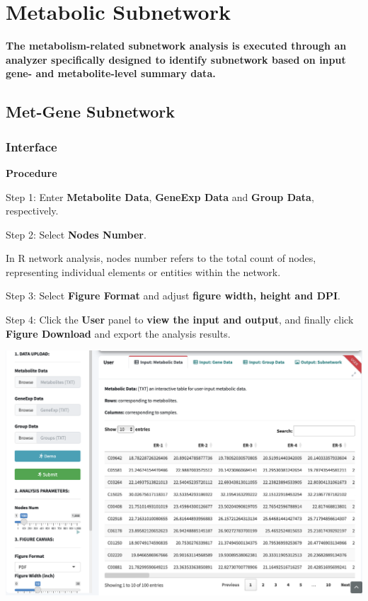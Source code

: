 \documentclass[
]{book}
\begin{document}
\chapter{Metabolic Subnetwork}\label{metabolic-subnetwork}

\textbf{The metabolism-related subnetwork analysis is executed through an analyzer specifically designed to identify subnetwork based on input gene- and metabolite-level summary data.}

\section{Met-Gene Subnetwork}\label{met-gene-subnetwork}

\subsection{Interface}\label{interface}

\textbf{Procedure}

Step 1: Enter \textbf{Metabolite Data}, \textbf{GeneExp Data} and \textbf{Group Data}, respectively.

Step 2: Select \textbf{Nodes Number}.

In R network analysis, nodes number refers to the total count of nodes, representing individual elements or entities within the network.

Step 3: Select \textbf{Figure Format} and adjust \textbf{figure width, height and DPI}.

Step 4: Click the \textbf{User} panel to \textbf{view the input and output}, and finally click \textbf{Figure Download} and export the analysis results.

\begin{center}\includegraphics[width=33.5in]{figure/1.M-G} \end{center}
\end{document}
